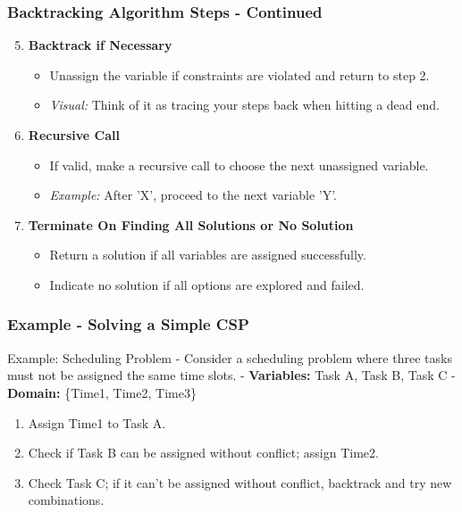 \documentclass[aspectratio=169]{beamer}
\begin{document}
\begin{frame}[fragile]
    \frametitle{Backtracking Algorithm Steps - Continued}
    \begin{enumerate}
        \setcounter{enumi}{4} %
        \item \textbf{Backtrack if Necessary}
            \begin{itemize}
                \item Unassign the variable if constraints are violated and return to step 2.
                \item \textit{Visual:} Think of it as tracing your steps back when hitting a dead end.
            \end{itemize}
        \item \textbf{Recursive Call}
            \begin{itemize}
                \item If valid, make a recursive call to choose the next unassigned variable.
                \item \textit{Example:} After 'X', proceed to the next variable 'Y'.
            \end{itemize}
        \item \textbf{Terminate On Finding All Solutions or No Solution}
            \begin{itemize}
                \item Return a solution if all variables are assigned successfully.
                \item Indicate no solution if all options are explored and failed.
            \end{itemize}
    \end{enumerate}
\end{frame}

\begin{frame}[fragile]
    \frametitle{Example - Solving a Simple CSP}
    \begin{block}{Example: Scheduling Problem}
        - Consider a scheduling problem where three tasks must not be assigned the same time slots.
        - \textbf{Variables:} Task A, Task B, Task C
        - \textbf{Domain:} \{Time1, Time2, Time3\}
        
        \begin{enumerate}
            \item Assign Time1 to Task A.
            \item Check if Task B can be assigned without conflict; assign Time2.
            \item Check Task C; if it can't be assigned without conflict, backtrack and try new combinations.
        \end{enumerate}
    \end{block}
\end{frame}
\end{document}
